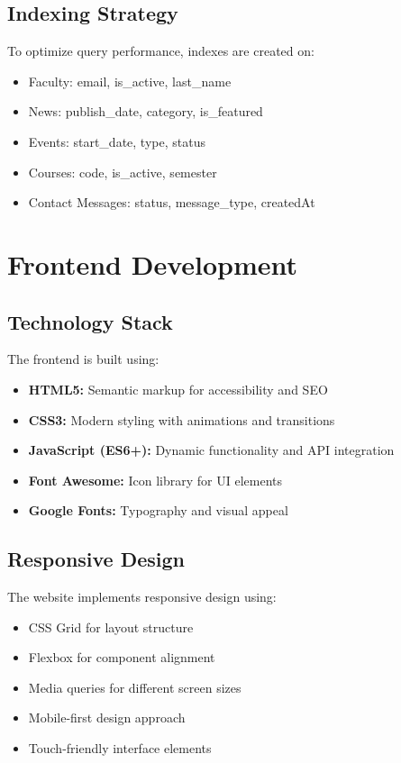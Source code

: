 \documentclass[12pt,a4paper]{report}
\begin{document}
\section{Indexing Strategy}
To optimize query performance, indexes are created on:
\begin{itemize}
    \item Faculty: email, is\_active, last\_name
    \item News: publish\_date, category, is\_featured
    \item Events: start\_date, type, status
    \item Courses: code, is\_active, semester
    \item Contact Messages: status, message\_type, createdAt
\end{itemize}

\chapter{Frontend Development}
\label{chap:frontend}

\section{Technology Stack}
The frontend is built using:
\begin{itemize}
    \item \textbf{HTML5:} Semantic markup for accessibility and SEO
    \item \textbf{CSS3:} Modern styling with animations and transitions
    \item \textbf{JavaScript (ES6+):} Dynamic functionality and API integration
    \item \textbf{Font Awesome:} Icon library for UI elements
    \item \textbf{Google Fonts:} Typography and visual appeal
\end{itemize}

\section{Responsive Design}
The website implements responsive design using:
\begin{itemize}
    \item CSS Grid for layout structure
    \item Flexbox for component alignment
    \item Media queries for different screen sizes
    \item Mobile-first design approach
    \item Touch-friendly interface elements
\end{itemize}
\end{document}
